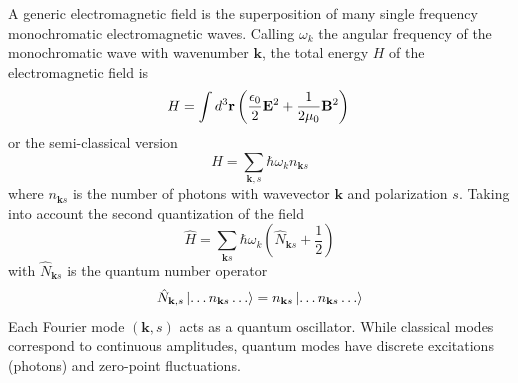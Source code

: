 \documentclass[../../../main.tex]{subfiles}
\begin{document}
A generic electromagnetic field is the superposition of many  single frequency monochromatic electromagnetic waves.
Calling $\omega_k$ the angular frequency of the monochromatic wave with wavenumber $\mathbf{k}$, the total energy $H$ of the electromagnetic field is
\begin{equation*}
  H =  \int d^3 \mathbf{r} \left( \frac{\epsilon_0}{2} \mathbf{E}^2 + \frac{1}{2\mu_0} \mathbf{B}^2 \right)                                                                        \\
\end{equation*}
or the semi-classical version
\begin{equation*}
  H = \sum_{\mathbf{k},s} \hbar \omega_k n_{\mathbf{k}s}
\end{equation*}
where $n_{\mathbf{k}s}$ is the number of photons with wavevector $\mathbf{k}$ and polarization $s$.
Taking into account the second quantization of the field
\begin{equation*}
  \hat{H }=\sum_{\mathbf{k}s} \hbar \omega_k \left( \hat{N }_{\mathbf{k} s }+ \frac{1 }{2} \right)
\end{equation*}
with $\hat{N}_{\mathbf{k}s}$ is the quantum number operator
\begin{align*}
  \hat{N}_{\mathbf{k},s} \ket{\dots n_{\mathbf{k}s} \dots}= n_{\mathbf{k}s} \ket{\dots n_{\mathbf{k}s} \dots}
\end{align*}
Each Fourier mode $(\mathbf{k },s)$ acts as a quantum oscillator.
While classical modes correspond to continuous amplitudes, quantum modes have discrete excitations (photons) and zero-point fluctuations.
\end{document}
